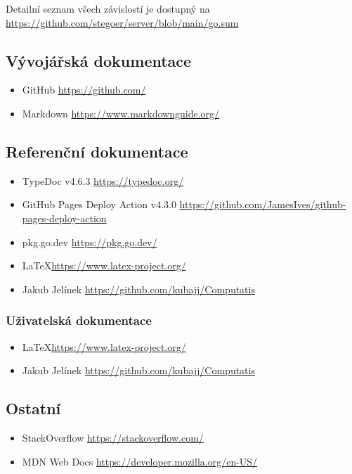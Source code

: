Detailní seznam všech závislostí je dostupný na
\url{https://github.com/stegoer/server/blob/main/go.sum}

\subsection{Vývojářská dokumentace}\label{subsec:dev-dokumentace}

\begin{itemize}
    \item GitHub \url{https://github.com/}
    \item Markdown \url{https://www.markdownguide.org/}
\end{itemize}

\subsection{Referenční dokumentace}\label{subsec:ref-dokumentace}

\begin{itemize}
    \item TypeDoc v4.6.3 \url{https://typedoc.org/}
    \item GitHub Pages Deploy Action v4.3.0 \url{https://github.com/JamesIves/github-pages-deploy-action}
    \item pkg.go.dev \url{https://pkg.go.dev/}
    \item \LaTeX \url{https://www.latex-project.org/}
    \item Jakub Jelínek \url{https://github.com/kubajj/Computatis}
\end{itemize}

\subsubsection{Uživatelská dokumentace}\label{subsec:user-dokumentace}

\begin{itemize}
    \item \LaTeX \url{https://www.latex-project.org/}
    \item Jakub Jelínek \url{https://github.com/kubajj/Computatis}
\end{itemize}

\subsection{Ostatní}\label{subsec:ostatni}

\begin{itemize}
    \item StackOverflow \url{https://stackoverflow.com/}
    \item MDN Web Docs \url{https://developer.mozilla.org/en-US/}
\end{itemize}
